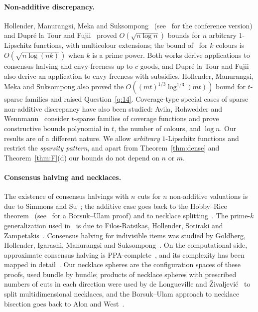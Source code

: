 \documentclass[11pt,letterpaper]{article}
\theoremstyle{definition}
\begin{document}
\paragraph{Non-additive discrepancy.}
Hollender, Manurangsi, Meka and Suksompong~\cite{HMMS25} (see~\cite{HMMS26} for the conference
version) and Dupr\'e la Tour and Fujii~\cite{DF25} proved $O(\sqrt{n\log n})$ bounds for $n$ arbitrary $1$-Lipschitz functions, with multicolour
extensions; the bound of~\cite{DF25} for $k$ colours is $O(\sqrt{n\log(nk)})$ when $k$ is a prime
power. Both works derive applications to consensus halving and envy-freeness up to $c$ goods, and
Dupr\'e la Tour and Fujii also derive an application to envy-freeness with subsidies. Hollender,
Manurangsi, Meka and Suksompong also proved the $O((mt)^{1/3}\log^{1/3}(mt))$ bound for $t$-sparse
families and raised Question~\ref{q:14}. Coverage-type special cases of sparse non-additive
discrepancy have also been studied: Avila, Rohwedder and Wennmann~\cite{ARW26} consider $t$-sparse
families of coverage functions and prove constructive bounds polynomial in $t$, the number of
colours, and $\log n$. Our results are of a different nature. We allow \emph{arbitrary}
$1$-Lipschitz functions and restrict the \emph{sparsity pattern}, and apart from Theorem~\ref{thm:dense} and Theorem~\ref{thm:F}(d) our bounds do not depend on
$n$ or $m$.

\paragraph{Consensus halving and necklaces.}
The existence of consensus halvings with $n$ cuts for $n$ non-additive valuations is due to
Simmons and Su~\cite{SS03}; the additive case goes back to the Hobby--Rice theorem~\cite{HR65}
(see~\cite{Pin76} for a Borsuk--Ulam proof) and to necklace splitting~\cite{Alo87}. The prime-$k$
generalization used in~\cite{HMMS25} is due to Filos-Ratsikas, Hollender, Sotiraki and
Zampetakis~\cite{FHSZ21}. Consensus halving for indivisible items was studied by Goldberg,
Hollender, Igarashi, Manurangsi and Suksompong~\cite{GHIMS20}. On the computational side,
approximate consensus halving is PPA-complete~\cite{FG18}, and its complexity has been mapped in
detail~\cite{FHSZ23}. Our necklace spheres are the configuration spaces of these proofs, used
bundle by bundle; products of necklace spheres with prescribed numbers of cuts in each direction
were used by de Longueville and \v{Z}ivaljevi\'c~\cite{dLZ08} to split multidimensional necklaces,
and the Borsuk--Ulam approach to necklace bisection goes back to Alon and West~\cite{AW86}.
\end{document}
